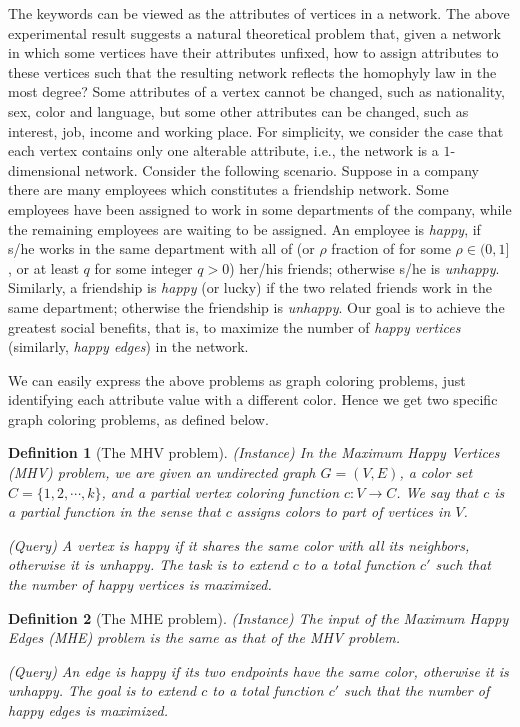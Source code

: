 \documentclass[11pt]{article}
\newtheorem{definition}{Definition}[section]
\begin{document}
The keywords can be viewed as the attributes of vertices in a network.
The above experimental result suggests a natural theoretical problem that,
given a network in which some vertices have their attributes unfixed,
how to assign attributes to these vertices such that the resulting
network reflects the homophyly law in the most degree?
Some attributes of a vertex cannot be changed, such as nationality, sex,
color and language, but some other attributes can be changed,
such as interest, job, income and working place.
For simplicity, we consider the case that each vertex contains only one
alterable attribute, i.e., the network is a $1$-dimensional network.
Consider the following scenario. Suppose in a company there are many employees
which constitutes a friendship network.
Some employees have been assigned to work in some departments of the
company, while the remaining employees are waiting to be assigned.
An employee is {\em happy}, if s/he works in the same department with all of
(or $\rho$ fraction of for some $\rho \in (0, 1]$, or at least $q$ for some
integer $q > 0$) her/his friends; otherwise s/he is {\em unhappy}.
Similarly, a friendship is {\em happy} (or lucky) if the two
related friends work in the same department; otherwise the friendship is
{\em unhappy}. Our goal is to achieve the greatest social benefits, that is,
to maximize the number of {\em happy vertices} (similarly, {\em happy edges})
in the network.



We can easily express the above problems as graph coloring problems,
just identifying each attribute value with a different color.
Hence we get two specific graph coloring problems, as defined below.


\begin{definition}[The MHV problem]
(Instance) In the Maximum Happy Vertices (MHV) problem, we are given
an undirected graph $G = (V, E)$, a color set $C = \{1, 2, \cdots, k \}$,
and a partial vertex coloring function $c \colon V \to C$. We say that $c$
is a partial function in the sense that $c$ assigns colors to part of
vertices in $V$.

(Query) A vertex is {\em happy} if it shares the same color with all its
neighbors, otherwise it is {\em unhappy}. The task is to extend $c$ to a total
function $c'$ such that the number of happy vertices is maximized.
\end{definition}

\begin{definition}[The MHE problem]
(Instance) The input of the Maximum Happy Edges (MHE) problem is the same
as that of the MHV problem.

(Query) An edge is {\em happy} if its two endpoints have the same color,
otherwise it is {\em unhappy}. The goal is to extend $c$ to a total function $c'$
such that the number of happy edges is maximized.
\end{definition}
\end{document}
